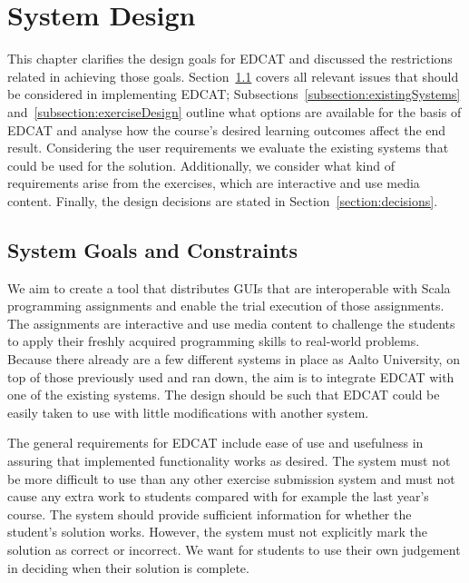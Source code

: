 \chapter{System Design}
\label{chapter:SystemDesign}

This chapter clarifies the design goals for EDCAT and discussed the restrictions related in achieving those goals. Section~\ref{section:GoalsAndConstraints} covers all relevant issues that should be considered in implementing EDCAT; Subsections~\ref{subsection:existingSystems} and~\ref{subsection:exerciseDesign} outline what options are available for the basis of EDCAT and analyse how the course's desired learning outcomes affect the end result. Considering the user requirements we evaluate the existing systems that could be used for the solution. Additionally, we consider what kind of requirements arise from the exercises, which are interactive and use media content. Finally, the design decisions are stated in Section~\ref{section:decisions}.


\section{System Goals and Constraints}
\label{section:GoalsAndConstraints}

We aim to create a tool that distributes GUIs that are interoperable with Scala programming assignments and enable the trial execution of those assignments. The assignments are interactive and use media content to challenge the students to apply their freshly acquired programming skills to real-world problems. Because there already are a few different systems in place as Aalto University, on top of those previously used and ran down, the aim is to integrate EDCAT with one of the existing systems. The design should be such that EDCAT could be easily taken to use with little modifications with another system.

The general requirements for EDCAT include ease of use and usefulness in assuring that implemented functionality works as desired. The system must not be more difficult to use than any other exercise submission system and must not cause any extra work to students compared with for example the last year's course. The system should provide sufficient information for whether the student's solution works. However, the system must not explicitly mark the solution as correct or incorrect. We want for students to use their own judgement in deciding when their solution is complete.

